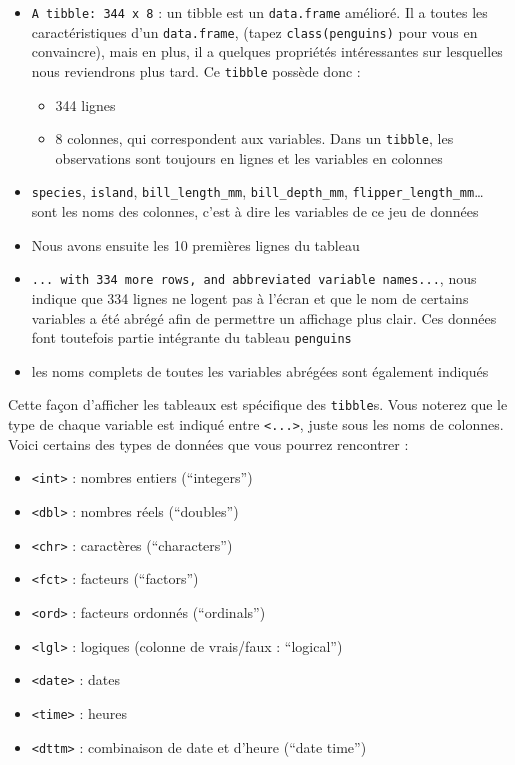 \documentclass[
  a4paper,
  DIV=11,
  numbers=noendperiod,
  oneside]{scrreprt}
\providecommand{\tightlist}{%
  \setlength{\itemsep}{0pt}\setlength{\parskip}{0pt}}\usepackage{longtable,booktabs,array}
\begin{document}
\begin{itemize}
\tightlist
\item
  \texttt{A\ tibble:\ 344\ x\ 8} : un tibble est un \texttt{data.frame}
  amélioré. Il a toutes les caractéristiques d'un \texttt{data.frame},
  (tapez \texttt{class(penguins)} pour vous en convaincre), mais en
  plus, il a quelques propriétés intéressantes sur lesquelles nous
  reviendrons plus tard. Ce \texttt{tibble} possède donc :

  \begin{itemize}
  \tightlist
  \item
    344 lignes
  \item
    8 colonnes, qui correspondent aux variables. Dans un
    \texttt{tibble}, les observations sont toujours en lignes et les
    variables en colonnes
  \end{itemize}
\item
  \texttt{species}, \texttt{island}, \texttt{bill\_length\_mm},
  \texttt{bill\_depth\_mm}, \texttt{flipper\_length\_mm}\ldots{} sont
  les noms des colonnes, c'est à dire les variables de ce jeu de données
\item
  Nous avons ensuite les 10 premières lignes du tableau
\item
  \texttt{...\ with\ 334\ more\ rows,\ and\ abbreviated\ variable\ names...},
  nous indique que 334 lignes ne logent pas à l'écran et que le nom de
  certains variables a été abrégé afin de permettre un affichage plus
  clair. Ces données font toutefois partie intégrante du tableau
  \texttt{penguins}
\item
  les noms complets de toutes les variables abrégées sont également
  indiqués
\end{itemize}

Cette façon d'afficher les tableaux est spécifique des \texttt{tibble}s.
Vous noterez que le type de chaque variable est indiqué entre
\texttt{\textless{}...\textgreater{}}, juste sous les noms de colonnes.
Voici certains des types de données que vous pourrez rencontrer :

\begin{itemize}
\tightlist
\item
  \texttt{\textless{}int\textgreater{}} : nombres entiers (``integers'')
\item
  \texttt{\textless{}dbl\textgreater{}} : nombres réels (``doubles'')
\item
  \texttt{\textless{}chr\textgreater{}} : caractères (``characters'')
\item
  \texttt{\textless{}fct\textgreater{}} : facteurs (``factors'')
\item
  \texttt{\textless{}ord\textgreater{}} : facteurs ordonnés
  (``ordinals'')
\item
  \texttt{\textless{}lgl\textgreater{}} : logiques (colonne de
  vrais/faux : ``logical'')
\item
  \texttt{\textless{}date\textgreater{}} : dates
\item
  \texttt{\textless{}time\textgreater{}} : heures
\item
  \texttt{\textless{}dttm\textgreater{}} : combinaison de date et
  d'heure (``date time'')
\end{itemize}
\end{document}
